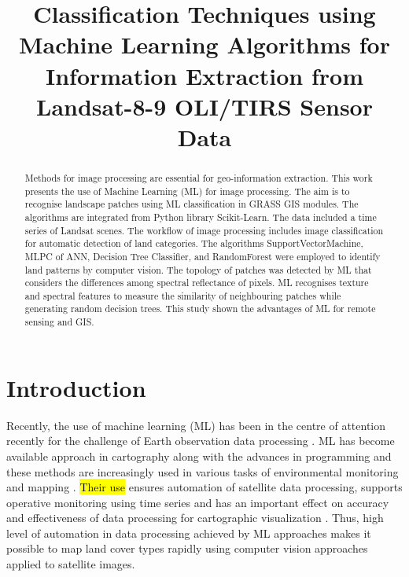\documentclass[eprint,
approc,		%
]{actapoly}
\begin{document}
\title[Classification Techniques using Machine Learning Algorithms...]
{Classification Techniques using Machine Learning Algorithms for Information Extraction from Landsat-8-9 OLI/TIRS Sensor Data}



\begin{abstract}
Methods for image processing are essential for geo-information extraction. This work presents the use of Machine Learning (ML) for image processing. The aim is to recognise landscape patches using ML classification in GRASS GIS modules. The algorithms are integrated from Python library Scikit-Learn. The data included a time series of Landsat scenes. The workflow of image processing includes image classification for automatic detection of land categories. The algorithms SupportVectorMachine, MLPC of ANN, Decision Tree Classifier, and RandomForest were employed to identify land patterns by computer vision. The topology of  patches was detected by ML that considers the differences among spectral reflectance of pixels. ML recognises texture and spectral features to measure the similarity of neighbouring patches while generating random decision trees. This study shown the advantages of ML for remote sensing and GIS.
\end{abstract}


\maketitle

\section{Introduction}

Recently, the use of machine learning (ML) has been in the centre of attention recently for the challenge of Earth observation data processing \citep{9395808,10041606,Lemenkova202320,8547145}. ML has become available approach in cartography along with the advances in programming and these methods are increasingly used in various tasks of environmental monitoring and mapping \citep{10142835,jimaging9050098,9850602}. \hl{Their use }ensures automation of satellite data processing, supports operative monitoring using time series and has an important effect on accuracy and effectiveness of data processing for cartographic visualization \citep{jmse12081279}. Thus, high level of automation in data processing achieved by ML approaches makes it possible to map land cover types rapidly using computer vision approaches applied to satellite images.
\end{document}
